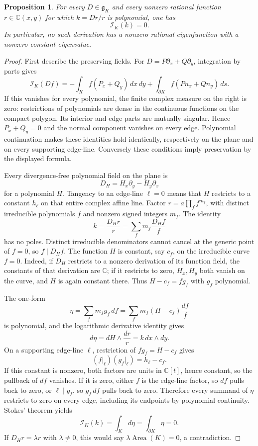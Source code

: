 \documentclass[11pt]{article}
\newtheorem{proposition}{Proposition}
\newcommand{\C}{\mathbb C}
\begin{document}
\begin{proposition}\label{prop:polygon-no-eigenfunctions}
For every $D\in\mathfrak g_K$ and every nonzero rational function
$r\in\C(x,y)$ for which $k=Dr/r$ is polynomial, one has
\[
 \mathcal I_K(k)=0.
\]
In particular, no such derivation has a nonzero rational eigenfunction
with a nonzero constant eigenvalue.
\end{proposition}
\begin{proof}
First describe the preserving fields. For $D=P\partial_x+Q\partial_y$,
integration by parts gives
\[
 \mathcal I_K(Df)
  =-\int_K f(P_x+Q_y)\,dx\,dy
      +\int_{\partial K} f(Pn_x+Qn_y)\,ds.
\]
If this vanishes for every polynomial, the finite complex measure on the
right is zero: restrictions of polynomials are dense in the continuous
functions on the compact polygon. Its interior and edge parts are
mutually singular. Hence $P_x+Q_y=0$ and the normal component vanishes
on every edge. Polynomial continuation makes these identities hold
identically, respectively on the plane and on every supporting edge-line.
Conversely these conditions imply preservation by the displayed formula.

Every divergence-free polynomial field on the plane is
\[
 D_H=H_x\partial_y-H_y\partial_x
\]
for a polynomial $H$. Tangency to an edge-line $\ell=0$ means that
$H$ restricts to a constant $h_\ell$ on that entire complex affine line.
Factor $r=a\prod_f f^{m_f}$, with distinct irreducible polynomials
$f$ and nonzero signed integers $m_f$. The identity
\[
 k=\frac{D_Hr}{r}=\sum_f m_f\frac{D_Hf}{f}
\]
has no poles. Distinct irreducible denominators cannot cancel at the
generic point of $f=0$, so $f\mid D_Hf$. The function $H$ is constant,
say $c_f$, on the irreducible curve $f=0$. Indeed, if $D_H$ restricts
to a nonzero derivation of its function field, the constants of that
derivation are $\C$; if it restricts to zero, $H_x,H_y$ both vanish
on the curve, and $H$ is again constant there. Thus
$H-c_f=f g_f$ with $g_f$ polynomial.

The one-form
\[
 \eta=\sum_f m_f g_f\,df
      =\sum_f m_f(H-c_f)\frac{df}{f}
\]
is polynomial, and the logarithmic derivative identity gives
\[
 d\eta=dH\wedge\frac{dr}{r}=k\,dx\wedge dy.
\]
On a supporting edge-line $\ell$, restriction of $f g_f=H-c_f$
gives
\[
 (f|_\ell)(g_f|_\ell)=h_\ell-c_f.
\]
If this constant is nonzero, both factors are units in $\C[t]$,
hence constant, so the pullback of $df$ vanishes. If it is zero,
either $f$ is the edge-line factor, so $df$ pulls back to zero,
or $\ell\mid g_f$, so $g_f\,df$ pulls back to zero.
Therefore every summand of $\eta$ restricts to zero on every edge,
including its endpoints by polynomial continuity. Stokes' theorem yields
\[
 \mathcal I_K(k)=\int_Kd\eta=\int_{\partial K}\eta=0.
\]
If $D_Hr=\lambda r$ with $\lambda\ne0$, this would say
$\lambda\operatorname{Area}(K)=0$, a contradiction.
\end{proof}
\end{document}
